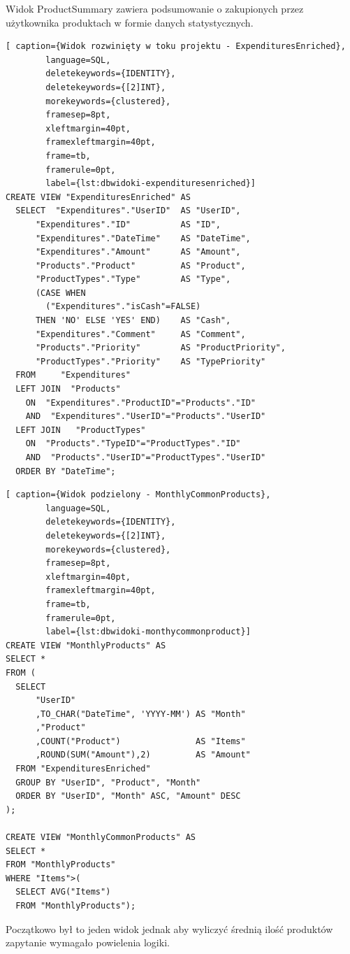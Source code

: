 \documentclass[a4paper, 10pt, twoside, openright]{report}
\begin{document}
\begin{large}
{Widok ProductSummary zawiera podsumowanie o zakupionych przez użytkownika 
produktach w formie danych statystycznych.}

\begin{minipage}{\textwidth}
    \begin{lstlisting}[ caption={Widok rozwinięty w toku projektu - ExpendituresEnriched},
        language=SQL,
        deletekeywords={IDENTITY},
        deletekeywords={[2]INT},
        morekeywords={clustered},
        framesep=8pt,
        xleftmargin=40pt,
        framexleftmargin=40pt,
        frame=tb,
        framerule=0pt,
        label={lst:dbwidoki-expendituresenriched}]
CREATE VIEW "ExpendituresEnriched" AS
  SELECT  "Expenditures"."UserID"  AS "UserID",
      "Expenditures"."ID"          AS "ID",
      "Expenditures"."DateTime"    AS "DateTime",
      "Expenditures"."Amount"      AS "Amount",
      "Products"."Product"         AS "Product",
      "ProductTypes"."Type"        AS "Type",
      (CASE WHEN 
        ("Expenditures"."isCash"=FALSE)
      THEN 'NO' ELSE 'YES' END)    AS "Cash",
      "Expenditures"."Comment"     AS "Comment",
      "Products"."Priority"        AS "ProductPriority",
      "ProductTypes"."Priority"    AS "TypePriority"
  FROM     "Expenditures"
  LEFT JOIN  "Products"
    ON  "Expenditures"."ProductID"="Products"."ID"
    AND  "Expenditures"."UserID"="Products"."UserID"
  LEFT JOIN   "ProductTypes"
    ON  "Products"."TypeID"="ProductTypes"."ID"
    AND  "Products"."UserID"="ProductTypes"."UserID"
  ORDER BY "DateTime";\end{lstlisting}
\end{minipage}

\begin{minipage}{\textwidth}
    \begin{lstlisting}[ caption={Widok podzielony - MonthlyCommonProducts},
        language=SQL,
        deletekeywords={IDENTITY},
        deletekeywords={[2]INT},
        morekeywords={clustered},
        framesep=8pt,
        xleftmargin=40pt,
        framexleftmargin=40pt,
        frame=tb,
        framerule=0pt,
        label={lst:dbwidoki-monthycommonproduct}]
CREATE VIEW "MonthlyProducts" AS
SELECT *
FROM (
  SELECT 
      "UserID"
      ,TO_CHAR("DateTime", 'YYYY-MM') AS "Month"
      ,"Product"
      ,COUNT("Product")               AS "Items"
      ,ROUND(SUM("Amount"),2)         AS "Amount"
  FROM "ExpendituresEnriched"
  GROUP BY "UserID", "Product", "Month"
  ORDER BY "UserID", "Month" ASC, "Amount" DESC
);

CREATE VIEW "MonthlyCommonProducts" AS
SELECT *
FROM "MonthlyProducts" 
WHERE "Items">(
  SELECT AVG("Items")
  FROM "MonthlyProducts");\end{lstlisting}
\end{minipage}
{Początkowo był to jeden widok jednak aby wyliczyć średnią ilość produktów 
zapytanie wymagało powielenia logiki.}


\end{large}
\end{document}
